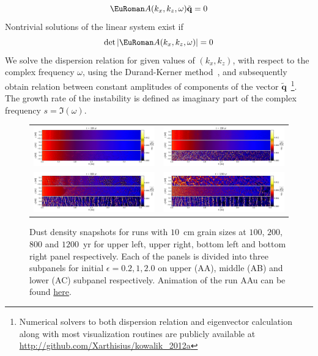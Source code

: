 \begin{equation}
 \eurom{A}(k_x,k_z,\omega)\tilde{\mathbf{q}} = 0
 \label{eq:linset}
\end{equation}
%
Nontrivial solutions of the linear system  exist if
\begin{equation}
 \det|\eurom{A}(k_x,k_z,\omega)|=0
 \label{eq:disprel}
\end{equation}
%
We solve the dispersion relation  for given values of
$(k_x,k_z)$, with respect to the complex frequency $\omega$, using the
Durand-Kerner method~\citep{D60,K66}, and subsequently obtain relation between
constant amplitudes of components of the vector
$\tilde{\mathbf{q}}$~\footnote{Numerical solvers to both dispersion relation and
eigenvector calculation along with most visualization routines are publicly
available at \url{http://github.com/Xarthisius/kowalik_2012a}}.  The growth rate
of the instability is defined as imaginary part of the complex frequency $s=\Im
(\omega)$.
%
\begin{figure}
   \centering
   \begin{tabular}{@{}cc@{}}
      \includegraphics[width=0.49\linewidth]{figures/fig2a} &
      \includegraphics[width=0.49\linewidth]{figures/fig2b} \\
      \includegraphics[width=0.49\linewidth]{figures/fig2c} &
      \includegraphics[width=0.49\linewidth]{figures/fig2d}
   \end{tabular}
\caption{Dust density snapshots for runs with $10$~cm grain sizes at $100$,
   $200$, $800$ and $1200$~yr for upper left, upper right, bottom left and
   bottom right panel respectively.  Each of the panels is divided into three
   subpanels for initial $\epsilon = 0.2, 1, 2.0$ on upper (AA), middle (AB) and
   lower (AC) subpanel respectively. Animation of the run AAu can be found 
   \href{http://youtu.be/b7myS1PA_tE}{here}.}
\label{fig2}
\end{figure}
%

